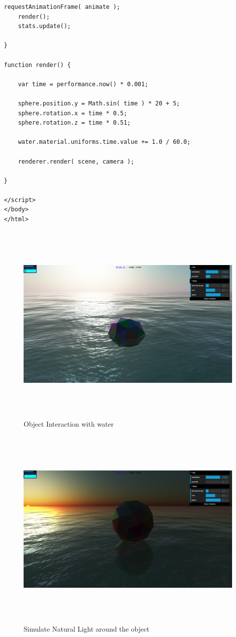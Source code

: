 \documentclass[BTech]{srmuthesis}
\begin{document}
\begin{lstlisting}[caption=Lighting and Water Simulation]
	requestAnimationFrame( animate );
	render();
	stats.update();
	
}

function render() {
	
	var time = performance.now() * 0.001;
	
	sphere.position.y = Math.sin( time ) * 20 + 5;
	sphere.rotation.x = time * 0.5;
	sphere.rotation.z = time * 0.51;
	
	water.material.uniforms.time.value += 1.0 / 60.0;
	
	renderer.render( scene, camera );
	
}

</script>
</body>
</html>
\end{lstlisting}
\begin{figure}[htbp]
	\centering
	\includegraphics[width=\linewidth, height=10cm,keepaspectratio]{render}
	\caption{Object Interaction with water}
	\label{fig:arch}
\end{figure}
\begin{figure}[htbp]
	\centering
	\includegraphics[width=\linewidth, height=10cm,keepaspectratio]{render2}
	\caption{Simulate Natural Light around the object}
	\label{fig:arch}
\end{figure}
\end{document}
